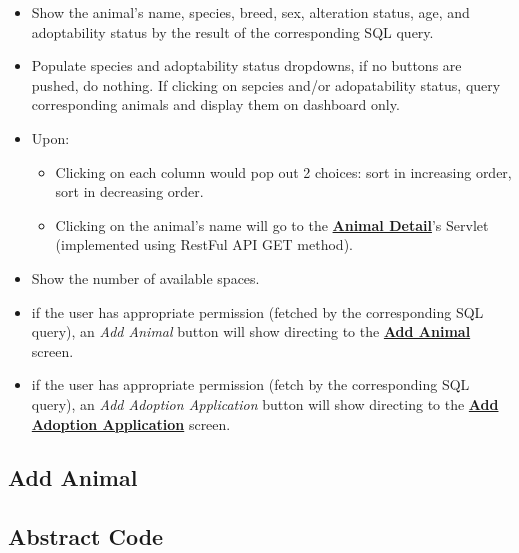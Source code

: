 \documentclass[a4paper]{article}
\begin{document}
\begin{itemize}
	\item Show the animal’s name, species, breed, sex, alteration status, age, and adoptability status by the result of the corresponding SQL query.
	\item Populate species and adoptability status dropdowns, if no buttons are pushed, do nothing. If clicking on sepcies and/or adopatability status, query corresponding animals and display them on dashboard only.

	\item Upon: \begin{itemize}
		\item Clicking on each column would pop out 2 choices: sort in increasing order, sort in decreasing order.
		\item Clicking on the animal's name will go to the \underline{\textbf{Animal Detail}}'s Servlet (implemented using RestFul API GET method).
	\end{itemize}
	\item Show the number of available spaces.
	\item if the user has appropriate permission (fetched by the corresponding SQL query), an \textit{Add Animal} button will show directing to the \underline{\textbf{Add Animal}} screen.
        \item if the user has appropriate permission (fetch by the corresponding SQL query), an \textit{Add Adoption Application} button will show directing to the \underline{\textbf{Add Adoption Application}} screen.
\end{itemize}

\hypertarget{add_animal}{\subsection{Add Animal}}

\subsection*{Abstract Code}
\end{document}

